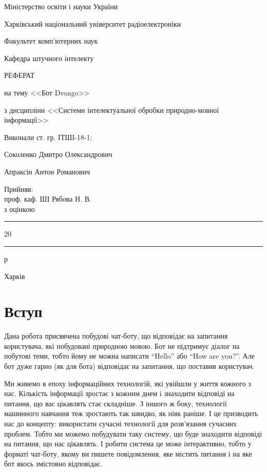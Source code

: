 \documentclass[a4paper,14pt]{extreport}
\newcommand\chap[1]{%
  \chapter*{#1}%
  \addcontentsline{toc}{chapter}{\uppercase{#1}}}
\begin{document}
\begin{titlepage}
	\centering
    Міністерство освіти і науки України
    
    Харківський національний університет радіоелектроніки
    \vspace{1cm}

    Факультет комп'ютерних наук
    \vspace{1cm}

    Кафедра штучного інтелекту

    \vspace{2cm}
    \uppercase{Реферат}
    \vspace{1cm}

    на тему <<Бот Dvango>>
    \vspace{1cm}

    з дисципліни <<Системи інтелектуальної обробки природно-мовної інформації>>

    \begin{flushleft}
    \vspace{4cm}
    \begin{minipage}[t]{8cm}
        Виконали ст. гр. ІТШІ-18-1:

        Соколенко Дмитро Олександрович

        Апраксін Антон Романович
    \end{minipage}
    \hfill
    \begin{minipage}[t]{6cm}
        Прийняв:\\
        проф. каф. ШІ Рябова Н. В.\\
        з оцінкою \say{\rule{2cm}{0.15mm}}\\
        \say{\rule{0.7cm}{0.15mm}}\rule{2cm}{0.15mm}20\rule{0.7cm}{0.15mm}р
    \end{minipage}
    \end{flushleft}
	\vfill

	{Харків \the\year{}}
\end{titlepage}
\restoregeometry

\tableofcontents
\newpage

\setcounter{page}{3}
\chap{Вступ}
    Дана робота присвячена побудові чат-боту, що відповідає на запитання користувача, які побудовані природною мовою. Бот не підтримує діалог на побутові теми, тобто йому не можна написати ``Hello'' або ``How are you?''. Але бот дуже гарно (як для бота) відповідає на запитання, що поставив користувач.

    Ми живемо в епоху інформаційних технологій, які увійшли у життя кожного з нас. Кількість інформації зростає з кожним днем і знаходити відповіді на питання, що вас цікавлять стає складніше. З іншого ж боку, технології машинного навчання теж зростають так швидко, як ніяк раніше. І це призводить нас до концепту: використати сучасні технології для розв'язання сучасних проблем. Тобто ми можемо побудувати таку систему, що буде знаходити відповіді на питання, що нас цікавлять. І робити система це може інтерактивно, тобто у форматі чат-боту, якому ви пишете повідомлення, яке містить питання і на яке бот якось змістовно відповідає.
\end{document}
